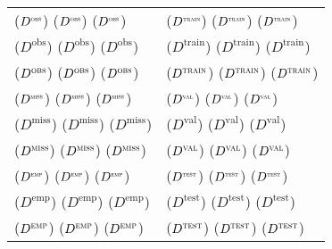 \documentclass{standalone}
\def\repeat#1{(#1) (#1) (#1)}
\begin{document}
\begin{tabular}{ll}
\repeat{$D^\textsc{\tiny obs}$} & \repeat{$D^\textsc{\tiny train}$}  \\
\repeat{$D^\text{obs}$}         & \repeat{$D^\text{train}$}          \\
\repeat{$D^\textsc{obs}$}       & \repeat{$D^\textsc{train}$}        \\
\hline
\repeat{$D^\textsc{\tiny miss}$} & \repeat{$D^\textsc{\tiny val}$}\\
\repeat{$D^\text{miss}$}         & \repeat{$D^\text{val}$}        \\
\repeat{$D^\textsc{miss}$}       & \repeat{$D^\textsc{val}$}      \\
\hline
\repeat{$D^\textsc{\tiny emp}$} & \repeat{$D^\textsc{\tiny test}$} \\
\repeat{$D^\text{emp}$}         & \repeat{$D^\text{test}$}         \\
\repeat{$D^\textsc{emp}$}       & \repeat{$D^\textsc{test}$}       \\
\end{tabular}
\end{document}
